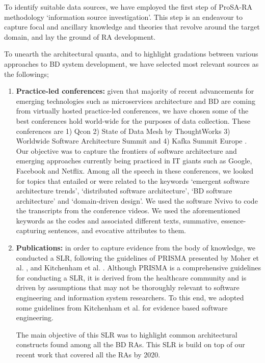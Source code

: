 \documentclass[review]{elsarticle}
\begin{document}
To identify suitable data sources, we have employed the first step of ProSA-RA methodology `information source investigation'. This step is an endeavour to capture focal and ancillary knowledge and theories that revolve around the target domain, and lay the ground of RA development.

To unearth the architectural quanta, and to highlight gradations between various approaches to BD system development, we have selected most relevant sources as the followings;

\begin{enumerate}
    \item{\bf{Practice-led conferences:}} given that majority of recent advancements for emerging technologies such as microservices architecture \cite{gan2019open, laigner2021data, laigner2021data} and BD are coming from virtually hosted practice-led conferences, we have chosen some of the best conferences hold world-wide for the purposes of data collection. These conferences are 1) Qcon \cite{QCON} 2) State of Data Mesh by ThoughtWorks \cite{ThoughtWorks} 3) Worldwide Software Architecture Summit \cite{Geekle} and 4) Kafka Summit Europe \cite{KafkaSummit}. Our objective was to capture the frontiers of software architecture and emerging approaches currently being practiced in IT giants such as Google, Facebook and Netflix. Among all the speech in these conferences, we looked for topics that entailed or were related to the keywords `emergent software architecture trends', `distributed software architecture', `BD software architecture' and `domain-driven design'. We used the software Nvivo to code the transcripts from the conference videos. We used the aforementioned keywords as the codes and associated different texts, summative, essence-capturing sentences, and evocative attributes to them.
    
    \item{\bf{Publications:}} in order to capture evidence from the body of knowledge, we conducted a SLR, following the guidelines of PRISMA presented by Moher et al. \cite{moher2015preferred}, and Kitchenham et al. \cite{kitchenham2015evidence}. Although PRISMA is a comprehensive guidelines for conducting a SLR, it is derived from the healthcare community and is driven by assumptions that may not be thoroughly relevant to software engineering and information system researchers. To this end, we adopted some guidelines from Kitchenham et al. for evidence based software engineering.
    
    The main objective of this SLR was to highlight common architectural constructs found among all the BD RAs. This SLR is build on top of our recent work \cite{AtaeiACIS} that covered all the RAs by 2020.


\end{enumerate}
\end{document}
